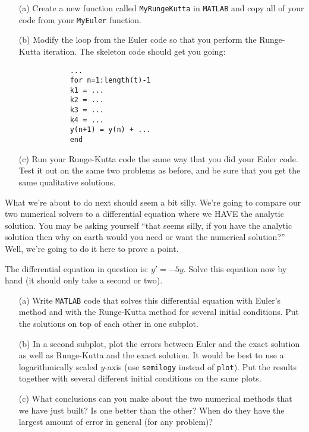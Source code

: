 \begin{problem}
    \begin{enumerate}
        \item[(a)] Create a new function called \texttt{MyRungeKutta} in \texttt{MATLAB} and copy
            all of your code from your \texttt{MyEuler} function.
        \item[(b)] Modify the loop from the Euler code so that you perform the Runge-Kutta
            iteration.  The skeleton code should get you going:
            \begin{verbatim}
            ...
            for n=1:length(t)-1
            k1 = ...
            k2 = ...
            k3 = ...
            k4 = ...
            y(n+1) = y(n) + ...
            end
            \end{verbatim}
        \item[(c)] Run your Runge-Kutta code the same way that you did your Euler code.  Test it
            out on the same two problems as before, and be sure that you get the same
            qualitative solutions.
    \end{enumerate}
\end{problem}


What we're about to do next should seem a bit silly.  We're going to compare our two
numerical solvers to a differential equation where we HAVE the analytic solution.  You may
be asking yourself ``that seems silly, if you have the analytic solution then why on earth
would you need or want the numerical solution?''  Well, we're going to do it here to prove
a point.  

\begin{problem}
The differential equation in question is: $y' = -5y$.  Solve this equation now by hand (it
should only take a second or two).
\begin{enumerate}
    \item[(a)] Write \texttt{MATLAB} code that solves this differential equation with Euler's
        method and with the Runge-Kutta method for several initial conditions.  Put the
        solutions on top of each other in one subplot.
    \item[(b)] In a second subplot, plot the errors between Euler and the exact solution as
        well as Runge-Kutta and the exact solution.  It would be best to use a
        logarithmically scaled $y$-axis (use \texttt{semilogy} instead of \texttt{plot}).
        Put the results together with several different initial conditions on the same
        plots.
    \item[(c)] What conclusions can you make about the two numerical methods that we have just
        built?  Is one better than the other?  When do they have the largest amount of
        error in general (for any problem)?
\end{enumerate}
\end{problem}

